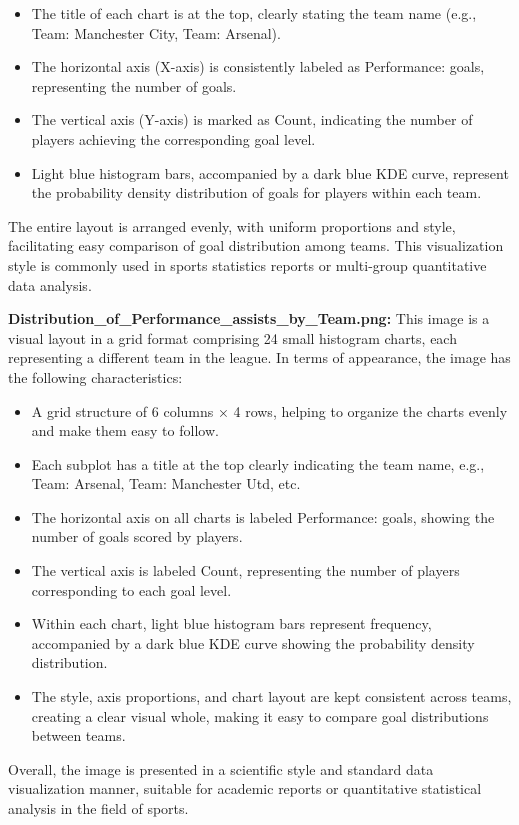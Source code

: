 \documentclass[12pt]{report}
\begin{document}
{{\begin{itemize}
	\item The title of each chart is at the top, clearly stating the team name (e.g., Team: Manchester City, Team: Arsenal).
	\item The horizontal axis (X-axis) is consistently labeled as Performance: goals, representing the number of goals.
	\item The vertical axis (Y-axis) is marked as Count, indicating the number of players achieving the corresponding goal level.
	\item Light blue histogram bars, accompanied by a dark blue KDE curve, represent the probability density distribution of goals for players within each team.
\end{itemize}
The entire layout is arranged evenly, with uniform proportions and style, facilitating easy comparison of goal distribution among teams. This visualization style is commonly used in sports statistics reports or multi-group quantitative data analysis.

\textbf{Distribution\_of\_Performance\_assists\_by\_Team.png:} %
This image is a visual layout in a grid format comprising 24 small histogram charts, each representing a different team in the league. In terms of appearance, the image has the following characteristics:
\begin{itemize}
	\item A grid structure of 6 columns × 4 rows, helping to organize the charts evenly and make them easy to follow.
	\item Each subplot has a title at the top clearly indicating the team name, e.g., Team: Arsenal, Team: Manchester Utd, etc.
	\item The horizontal axis on all charts is labeled Performance: goals, showing the number of goals scored by players.
	\item The vertical axis is labeled Count, representing the number of players corresponding to each goal level.
	\item Within each chart, light blue histogram bars represent frequency, accompanied by a dark blue KDE curve showing the probability density distribution.
	\item The style, axis proportions, and chart layout are kept consistent across teams, creating a clear visual whole, making it easy to compare goal distributions between teams.
\end{itemize}
Overall, the image is presented in a scientific style and standard data visualization manner, suitable for academic reports or quantitative statistical analysis in the field of sports.

}}
\end{document}
